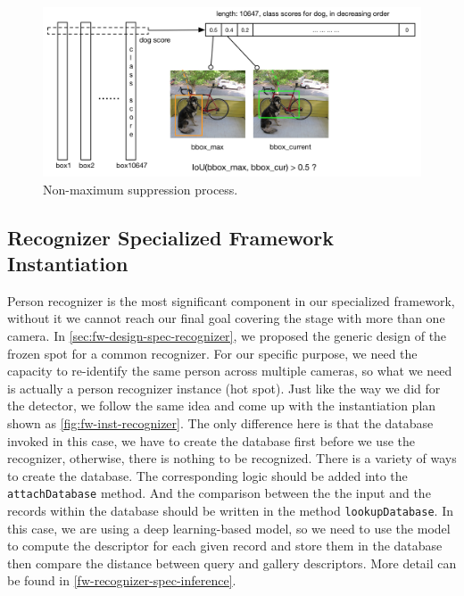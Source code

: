 \begin{figure}
    \includegraphics[width=\linewidth]{figures/framework_detector_nms.png}
    \caption{Non-maximum suppression process.}
    \label{fig:fw-detector-nms}
\end{figure}

\subsection{Recognizer Specialized Framework Instantiation}
\label{sec:fw-inst-recoginzer}

Person recognizer is the most significant component in our specialized
framework, without it we cannot reach our final goal covering the stage with
more than one camera. In \autoref{sec:fw-design-spec-recognizer}, we proposed the
generic design of the frozen spot for a common recognizer. For our specific
purpose, we need the capacity to re-identify the same person across multiple
cameras, so what we need is actually a person recognizer instance (hot spot).
Just like the way we did for the detector, we follow the same idea and come up with
the instantiation plan shown as \autoref{fig:fw-inst-recognizer}. The only
difference here is that the database invoked in this case, we have to create
the database first before we use the recognizer, otherwise, there is nothing to
be recognized. There is a variety of ways to create the database. The corresponding
logic should be added into the \texttt{attachDatabase} method. And the
comparison between the the input and the records within the database should be written in
the method \texttt{lookupDatabase}. In this case, we are using a deep
learning-based model, so we need to use the model to compute the
descriptor for each given record and store them in the database then compare the
distance between query and gallery descriptors. More detail can be found in
\autoref{fw-recognizer-spec-inference}.

